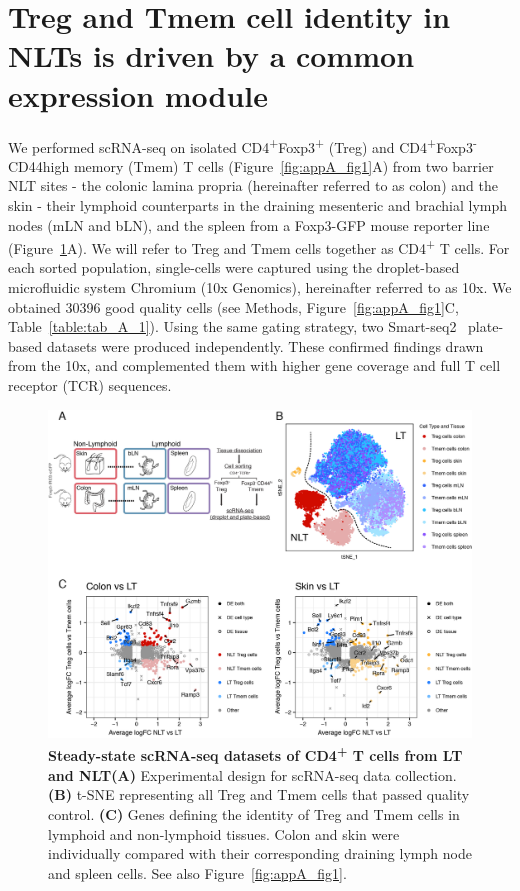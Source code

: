 \section{Treg and Tmem cell identity in NLTs is driven by a common expression module}
\label{section2.2}
We performed scRNA-seq on isolated CD4\textsuperscript{+}Foxp3\textsuperscript{+} (Treg) and CD4\textsuperscript{+}Foxp3\textsuperscript{-}CD44high memory (Tmem) T cells (Figure~\ref{fig:appA_fig1}A) from two barrier NLT sites - the colonic lamina propria (hereinafter referred to as colon) and the skin - their lymphoid counterparts in the draining mesenteric and brachial lymph nodes (mLN and bLN), and the spleen from a Foxp3-GFP mouse reporter line~\citep{Bettelli2006-dw} (Figure~\ref{fig:chap2_fig1}A). We will refer to Treg and Tmem cells together as CD4\textsuperscript{+} T cells. For each sorted population, single-cells were captured using the droplet-based microfluidic system Chromium (10x Genomics), hereinafter referred to as 10x. We obtained 30396 good quality cells (see Methods, Figure~\ref{fig:appA_fig1}C, Table~\ref{table:tab_A_1}). Using the same gating strategy, two Smart-seq2~\citep{picelli_full-length_2014} plate-based datasets were produced independently. These confirmed findings drawn from the 10x, and complemented them with higher gene coverage and full T cell receptor (TCR) sequences.

\begin{figure}[ht!] 
\centering    
\includegraphics[width=1.0\textwidth]{Chapter2/Figs/chap2_fig1.png} %
\caption[Steady-state scRNA-seq datasets of CD4\textsuperscript{+} T cells from LT and NLT]{\textbf{Steady-state scRNA-seq datasets of CD4\textsuperscript{+} T cells from LT and NLT}\newline\textbf{(A)} Experimental design for scRNA-seq data collection. \textbf{(B)} t-SNE representing all Treg and Tmem cells that passed quality control. \textbf{(C)} Genes defining the identity of Treg and Tmem cells in lymphoid and non-lymphoid tissues. Colon and skin were individually compared with their corresponding draining lymph node and spleen cells. See also Figure~\ref{fig:appA_fig1}.}
\label{fig:chap2_fig1}
\end{figure}

